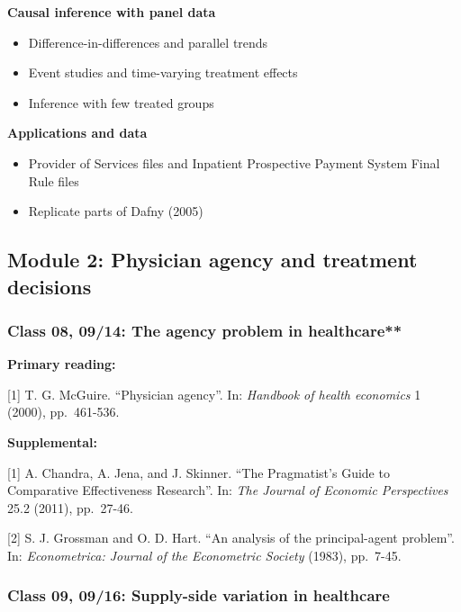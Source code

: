 \documentclass[11pt,]{article}
\providecommand{\tightlist}{%
  \setlength{\itemsep}{0pt}\setlength{\parskip}{0pt}}
\begin{document}
\textbf{Causal inference with panel data}

\begin{itemize}
\tightlist
\item
  Difference-in-differences and parallel trends
\item
  Event studies and time-varying treatment effects
\item
  Inference with few treated groups
\end{itemize}

\textbf{Applications and data}

\begin{itemize}
\tightlist
\item
  Provider of Services files and Inpatient Prospective Payment System
  Final Rule files
\item
  Replicate parts of Dafny (2005)
\end{itemize}

\hypertarget{module-2-physician-agency-and-treatment-decisions}{%
\subsection{Module 2: Physician agency and treatment
decisions}\label{module-2-physician-agency-and-treatment-decisions}}

\hypertarget{class-08-0914-the-agency-problem-in-healthcare}{%
\subsubsection{Class 08, 09/14: The agency problem in
healthcare**}\label{class-08-0914-the-agency-problem-in-healthcare}}

\textbf{Primary reading:}

{[}1{]} T. G. McGuire. ``Physician agency''. In: \emph{Handbook of
health economics} 1 (2000), pp.~461-536.

\textbf{Supplemental:}

{[}1{]} A. Chandra, A. Jena, and J. Skinner. ``The Pragmatist's Guide to
Comparative Effectiveness Research''. In: \emph{The Journal of Economic
Perspectives} 25.2 (2011), pp.~27-46.

{[}2{]} S. J. Grossman and O. D. Hart. ``An analysis of the
principal-agent problem''. In: \emph{Econometrica: Journal of the
Econometric Society} (1983), pp.~7-45.

\hypertarget{class-09-0916-supply-side-variation-in-healthcare}{%
\subsubsection{Class 09, 09/16: Supply-side variation in
healthcare}\label{class-09-0916-supply-side-variation-in-healthcare}}
\end{document}
